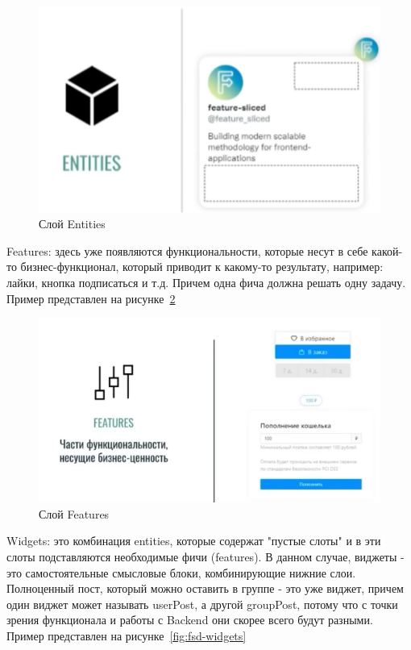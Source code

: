\begin{figure}
  \includegraphics[scale=1]{styles/diploma/inc/fsd-entities.png}
  \caption{Слой Entities}
  \label{fig:fsd-entities}
\end{figure}

Features: здесь уже появляются функциональности, которые несут в себе какой-то бизнес-функционал, который приводит к какому-то результату, например: лайки, кнопка подписаться и т.д. Причем одна фича должна решать одну задачу. Пример представлен на рисунке~\ref{fig:fsd-features}

\begin{figure}
  \includegraphics[scale=1]{styles/diploma/inc/fsd-features.png}
  \caption{Слой Features}
  \label{fig:fsd-features}
\end{figure}

Widgets: это комбинация entities, которые содержат "пустые слоты" и в эти слоты подставляются необходимые фичи (features). В данном случае, виджеты - это самостоятельные смысловые блоки, комбинирующие нижние слои. Полноценный пост, который можно оставить в группе - это уже виджет, причем один виджет может называть userPost, а другой groupPost, потому что с точки зрения функционала и работы с Backend они скорее всего будут разными. Пример представлен на рисунке~\ref{fig:fsd-widgets}

